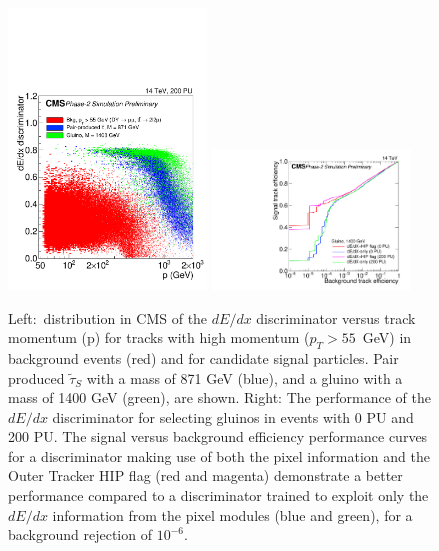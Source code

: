 \begin{figure}[t]
\begin{center}
  \includegraphics[width=0.47\textwidth]{figures/HSCP/TDR-17-001_fig6_26_a_HSCP_SpecialPlot_v2.pdf} \hfill
  \includegraphics[width=0.47\textwidth]{figures/HSCP/TDR-17-001_fig6_27_a_HSCP_Comparison_ROC_Gluino_M1400_NoPU_Super_v2.pdf}
  \caption{ Left:~distribution in  CMS of the $dE/dx$ discriminator versus track momentum (p) for tracks with high momentum ($p_T > 55$~GeV) in background events (red) and for candidate signal particles. Pair produced $\tilde{\tau}_S$ with a mass of 871 GeV (blue), and a gluino with a mass of 1400 GeV (green), are shown. 
Right: The performance of the $dE/dx$ discriminator for selecting gluinos in events with 0 PU and 200 PU. The signal versus background efficiency performance curves for a discriminator making use of both the pixel information and the Outer Tracker HIP flag (red and magenta) demonstrate a better performance compared to a discriminator trained to exploit only the $dE/dx$ information from the pixel modules (blue and green), for a background rejection of $10^{-6}$. 
 }
  \label{fig:cmsupgrade_hscp}
\end{center}
\end{figure}

